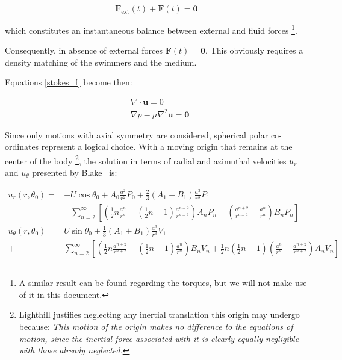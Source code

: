 \begin{equation}
\mathbf{F_{\mathrm{ext}}}(t)+\mathbf{F}(t)= \mathbf{0}
\end{equation}

which constitutes an instantaneous balance between external and fluid forces \footnote{A similar result can be found regarding the torques, but we will not make use of it in this document.}.

Consequently, in absence of external forces $\mathbf{F}(t) = \mathbf{0}$. This obviously requires a density matching of the swimmers and the medium.

Equations \ref{stokes_f} become then:

\begin{equation}
\begin{aligned} & \nabla \cdot \mathbf{u}=0 \\
& \nabla p-\mu \nabla^{2} \mathbf{u}=\mathbf{0} \label{stokes_f} \end{aligned}
\end{equation}

Since only motions with axial symmetry are considered, spherical polar co-ordinates represent a logical choice. With a moving origin that remains at the center of the body \footnote{Lighthill justifies neglecting any inertial translation this origin may undergo because: \textit{This motion of the origin makes no difference to the equations of motion, since the inertial force associated with it is clearly equally negligible with those already neglected.}}, the solution in terms of radial and azimuthal velocities $u_r$ and $u_\theta$ presented by Blake~\cite{Blake} is:

\begin{equation}
\begin{aligned} u_{r}\left(r, \theta_{0}\right)=&-U \cos \theta_{0}+A_{0} \frac{a^{2}}{r^{2}} P_{0}+\frac{2}{3}\left(A_{1}+B_{1}\right) \frac{a^{3}}{r^{3}} P_{1} \\ &+\sum_{n=2}^{\infty}\left[\left(\frac{1}{2} n \frac{a^{n}}{r^{n}}-\left(\frac{1}{2} n-1\right) \frac{a^{n+2}}{r^{n+2}}\right) A_{n} P_{n}+\left(\frac{a^{n+2}}{r^{n+2}}-\frac{a^{n}}{r^{n}}\right) B_{n} P_{n}\right] \\ u_{\theta}\left(r, \theta_{0}\right)=& U \sin \theta_{0}+\frac{1}{3}\left(A_{1}+B_{1}\right) \frac{a^{3}}{r^{3}} V_{1} \\+& \sum_{n=2}^{\infty}\left[\left(\frac{1}{2} n \frac{a^{n+2}}{r^{n+2}}-\left(\frac{1}{2} n-1\right) \frac{a^{n}}{r^{n}}\right) B_{n} V_{n}+\frac{1}{2} n\left(\frac{1}{2} n-1\right)\left(\frac{a^{n}}{r^{n}}-\frac{a^{n+2}}{r^{n+2}}\right) A_{n} V_{n}\right] \end{aligned}
\label{stokes_sol_uv}
\end{equation}

